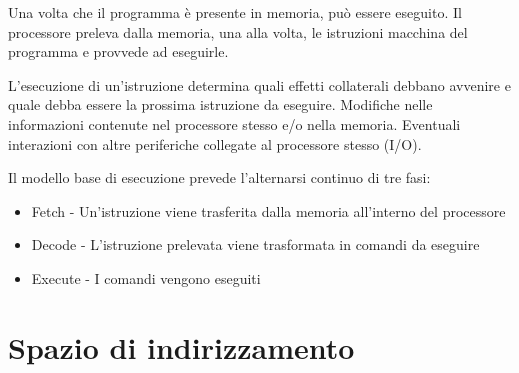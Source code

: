 Una volta che il programma è presente in memoria, può essere eseguito. Il processore preleva dalla memoria, una alla volta, le istruzioni macchina del programma e provvede ad eseguirle.


L'esecuzione di un'istruzione determina quali effetti collaterali debbano avvenire e quale debba essere la prossima istruzione da eseguire. Modifiche nelle informazioni contenute nel processore stesso e/o nella memoria. Eventuali interazioni con altre periferiche collegate al processore stesso (I/O). \newline

Il modello base di esecuzione prevede l'alternarsi continuo di tre fasi:

\begin{itemize}
  \item Fetch - Un'istruzione viene trasferita dalla memoria all'interno del processore
  \item Decode - L'istruzione prelevata viene trasformata in comandi da eseguire
  \item Execute - I comandi vengono eseguiti
\end{itemize}




\section{Spazio di indirizzamento  }

